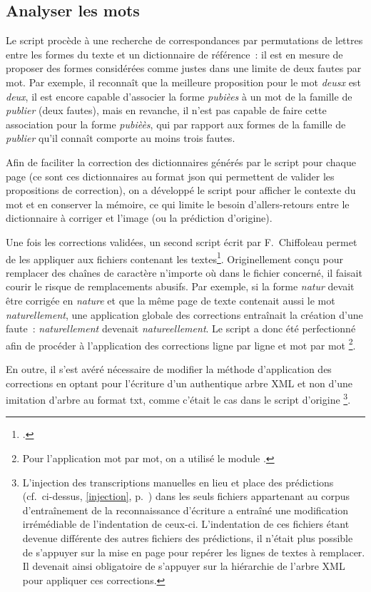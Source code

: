 \documentclass[a4paper,12pt,twoside]{book}
\begin{document}
			\subsection{Analyser les mots}
				Le script procède à une recherche de correspondances par permutations de lettres entre les formes du texte et un dictionnaire de référence~: il est en mesure de proposer des formes considérées comme justes dans une limite de deux fautes par mot. Par exemple, il reconnaît que la meilleure proposition pour le mot \textit{deusx} est \textit{deux}, il est encore capable d'associer la forme \textit{pubièes} à un mot de la famille de \textit{publier} (deux fautes), mais en revanche, il n'est pas capable de faire cette association pour la forme \textit{pubièès}, qui par rapport aux formes de la famille de \textit{publier} qu'il connaît comporte au moins trois fautes.
						
				Afin de faciliter la correction des dictionnaires générés par le script pour chaque page (ce sont ces dictionnaires au format \gls{json} qui permettent de valider les propositions de correction), on a développé le script pour afficher le contexte du mot et en conserver la mémoire, ce qui limite le besoin d'allers-retours entre le dictionnaire à corriger et l'image (ou la \gls{prédiction} d'origine).
				
				Une fois les corrections validées, un second script écrit par F.~Chiffoleau permet de les appliquer aux fichiers contenant les textes\footcite{biayTextCorrectionPy2022}. Originellement conçu pour remplacer des chaînes de caractère n'importe où dans le fichier concerné, il faisait courir le risque de remplacements abusifs. Par exemple, si la forme \textit{natur} devait être corrigée en \textit{nature} et que la même page de texte contenait aussi le mot \textit{naturellement}, une application globale des corrections entraînait la création d'une faute~: \textit{naturellement} devenait \textit{natureellement}. Le script a donc été perfectionné afin de procéder à l'application des corrections ligne par ligne et mot par mot
				\footnote{Pour l'application mot par mot, on a utilisé le module \cite{SpaCyIndustrialstrengthNatural}.}.
				
				En outre, il s'est avéré nécessaire de modifier la méthode d'application des corrections en optant pour l'écriture d'un authentique arbre XML et non d'une imitation d'arbre au format \textsf{txt}, comme c'était le cas dans le script d'origine
				\footnote{L'injection des transcriptions manuelles en lieu et place des \glspl{prédiction} (cf.~ci-dessus, \ref{injection}, p.~\pageref{injection}) dans les seuls fichiers appartenant au corpus d'entraînement de la reconnaissance d'écriture a entraîné une modification irrémédiable de l'indentation de ceux-ci. L'indentation de ces fichiers étant devenue différente des autres fichiers des \glspl{prédiction}, il n'était plus possible de s'appuyer sur la mise en page pour repérer les lignes de textes à remplacer. Il devenait ainsi obligatoire de s'appuyer sur la hiérarchie de l'arbre XML pour appliquer ces corrections.}.
\end{document}
